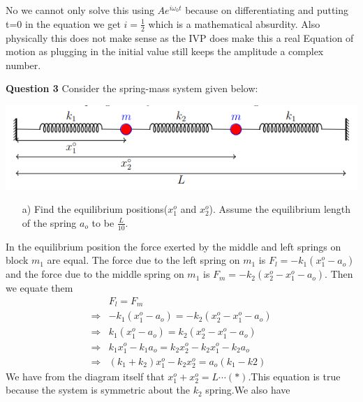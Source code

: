 \documentclass[addpoints]{exam}
\begin{document}
\begin{questions}
\begin{solution}
\begin{align*}
 \end{align*}
 \begin{center}
 \\
 \end{center} 
 No we cannot only solve this using $Ae^{i\omega_0 t}$ because on differentiating and putting t=0 in the equation we get $i=\frac{1}{2}$ which is a mathematical absurdity. 
 Also physically this does not make sense as the IVP does make this a real Equation of motion as plugging in the initial value still keeps the amplitude a complex number.
\end{solution}
\question \textbf{ Question 3}
Consider the spring-mass system given below:
\begin{center}
    \includegraphics[width = 5 in]{q3.png}
\end{center}
\begin{enumerate}
    \item[a)] Find the equilibrium positions($x_1^o$ and $x_2^o$). Assume the equilibrium length of the spring $a_o$ to be $\frac{L}{10}$.
\end{enumerate}
\begin{solution}
    In the equilibrium position the force exerted by the middle and left springs on block $m_1$ are equal. The force due to the left spring on $m_1$ is 
    $F_l = -k_1(x^o_1 - a_o)$ and the force due to the middle spring on $m_1$ is $F_m = -k_2(x_2^o-x_1^o-a_o)$. Then we equate them
    \begin{align*}
        &F_l = F_m\\ 
        \Rightarrow & -k_1(x^o_1 - a_o) = -k_2(x_2^o-x_1^o-a_o)\\
        \Rightarrow & k_1(x^o_1 - a_o) = k_2(x_2^o-x_1^o-a_o) \\ 
        \Rightarrow & k_1x^o_1 - k_1a_o = k_2x_2^o-k_2x_1^o-k_2a_o \\
        \Rightarrow & (k_1+k_2)x_1^o-k_2 x_2^o = a_o(k_1-k2)
    \end{align*}
    We have from the diagram itself that $x_1^o + x_2^o = L\cdots (*)$.This equation is true because the system is symmetric about the $k_2$ spring.We also have 

\end{solution}
\end{questions}
\end{document}
